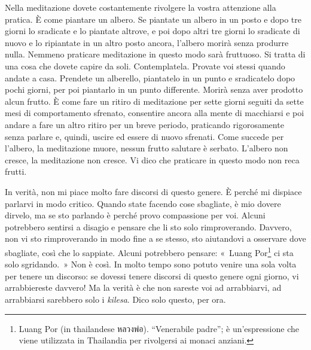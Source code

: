 Nella meditazione dovete costantemente rivolgere la vostra attenzione
alla pratica. È come piantare un albero. Se piantate un albero in un
posto e dopo tre giorni lo sradicate e lo piantate altrove, e poi dopo
altri tre giorni lo sradicate di nuovo e lo ripiantate in un altro posto
ancora, l'albero morirà senza produrre nulla. Nemmeno praticare
meditazione in questo modo sarà fruttuoso. Si tratta di una cosa che
dovete capire da soli. Contemplatela. Provate voi stessi quando andate a
casa. Prendete un alberello, piantatelo in un punto e sradicatelo dopo
pochi giorni, per poi piantarlo in un punto differente. Morirà senza
aver prodotto alcun frutto. È come fare un ritiro di meditazione per
sette giorni seguiti da sette mesi di comportamento sfrenato, consentire
ancora alla mente di macchiarsi e poi andare a fare un altro ritiro per
un breve periodo, praticando rigorosamente senza parlare e, quindi,
uscire ed essere di nuovo sfrenati. Come succede per l'albero, la
meditazione muore, nessun frutto salutare è serbato. L'albero non
cresce, la meditazione non cresce. Vi dico che praticare in questo modo
non reca frutti.

In verità, non mi piace molto fare discorsi di questo genere. È perché
mi dispiace parlarvi in modo critico. Quando state facendo cose
sbagliate, è mio dovere dirvelo, ma se sto parlando è perché provo
compassione per voi. Alcuni potrebbero sentirsi a disagio e pensare che
li sto solo rimproverando. Davvero, non vi sto rimproverando in modo
fine a se stesso, sto aiutandovi a osservare dove sbagliate, così che lo
sappiate. Alcuni potrebbero pensare: «~Luang Por\footnote{Luang Por (in
  thailandese หลวงพ่อ). ``Venerabile padre''; è un'espressione che viene
  utilizzata in Thailandia per rivolgersi ai monaci anziani.} ci sta
solo sgridando.~» Non è così. In molto tempo sono potuto venire una sola
volta per tenere un discorso: se dovessi tenere discorsi di questo
genere ogni giorno, vi arrabbiereste davvero! Ma la verità è che non
sareste voi ad arrabbiarvi, ad arrabbiarsi sarebbero solo i
\emph{kilesa}. Dico solo questo, per ora.

